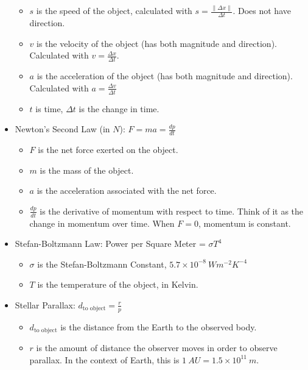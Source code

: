 \documentclass[letterpaper,14pt]{extarticle}
\begin{document}
\begin{itemize}
\begin{itemize}
        \item $s$ is the speed of the object, calculated with $s = \frac{\|\Delta x\|}{\Delta t}$. Does not have direction.
        \item $v$ is the velocity of the object (has both magnitude and direction). Calculated with $v = \frac{\Delta x}{\Delta t}$.
        \item $a$ is the acceleration of the object (has both magnitude and direction). Calculated with $a = \frac{\Delta v}{\Delta t}$
        \item $t$ is time, $\Delta t$ is the change in time.
    \end{itemize}
    \item Newton's Second Law (in $N$): $F = ma = \frac{dp}{dt}$
    \begin{itemize}
        \item $F$ is the net force exerted on the object.
        \item $m$ is the mass of the object.
        \item $a$ is the acceleration associated with the net force.
        \item $\frac{dp}{dt}$ is the derivative of momentum with respect to time. Think of it as the change in momentum over time. When $F = 0$, momentum is constant.
    \end{itemize}
    \item Stefan-Boltzmann Law: Power per Square Meter = $\sigma T^4$
    \begin{itemize}
        \item $\sigma$ is the Stefan-Boltzmann Constant, $5.7 \times 10^{-8}\ Wm^{-2}K^{-4}$
        \item $T$ is the temperature of the object, in Kelvin.
    \end{itemize}
    \item Stellar Parallax: $d_{\text{to object}} = \frac{r}{p}$
    \begin{center}
        
    \end{center}
    \begin{itemize}
        \item $d_{\text{to object}}$ is the distance from the Earth to the observed body.
        \item $r$ is the amount of distance the observer moves in order to observe parallax. In the context of Earth, this is $1\ AU = 1.5 \times 10^{11}\ m$.

\end{itemize}
\end{itemize}
\end{document}
